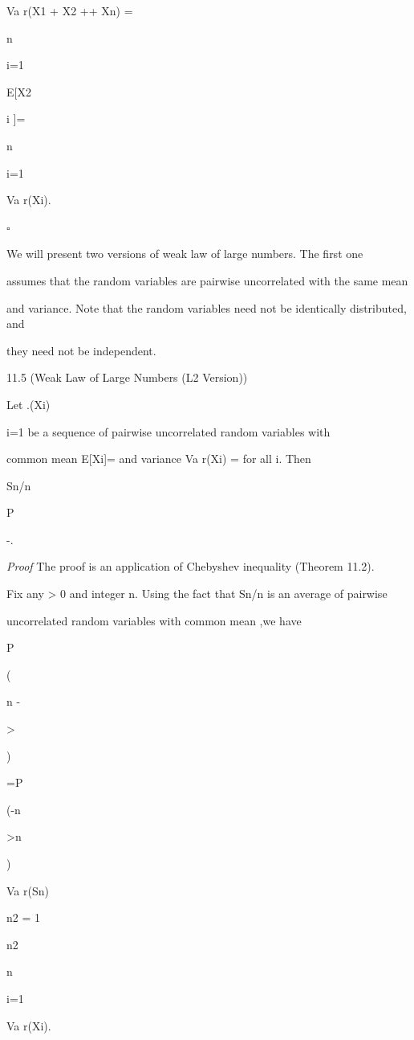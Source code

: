 Va r(X1 + X2 +\cdot\cdot\cdot+ Xn) =

n\sum

i=1

E[X2

i ]=

n\sum

i=1

Va r(Xi).

\hfill $\square$

We will present two versions of weak law of large numbers. The first one

assumes that the random variables are pairwise uncorrelated with the same mean

and variance. Note that the random variables need not be identically distributed, and

they need not be independent.

\begin{thmbox}{11.5 (Weak Law of Large Numbers (L2 Version))}
\end{thmbox}

Let .(Xi)\infty

i=1 be a sequence of pairwise uncorrelated random variables with

common mean E[Xi]= \mu and variance Va r(Xi) =  for all i. Then

Sn/n

P

-\to \mu.

\textit{Proof} The proof is an application of Chebyshev inequality (Theorem 11.2).

Fix any \epsilon> 0 and integer n. Using the fact that Sn/n is an average of pairwise

uncorrelated random variables with common mean \mu,we have

P

(\vert\vertSn

n -\mu

\vert\vert >\epsilon

)

=P

(\vert\vertSn -n\mu

\vert\vert >n \epsilon

)

\leq Va r(Sn)

n2 = 1

n2

n\sum

i=1

Va r(Xi).

